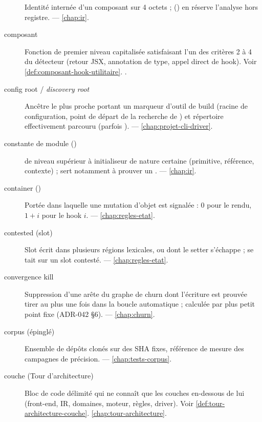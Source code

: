 \begin{description}
\item[] Identité internée d'un composant sur 4 octets ;  () en réserve l'analyse hors registre.  — \cref{chap:ir}.

\item[composant] Fonction de premier niveau capitalisée satisfaisant l'un des critères 2 à 4 du détecteur (retour JSX, annotation de type, appel direct de hook). Voir \cref{def:composant-hook-utilitaire}. .

\item[config root / \emph{discovery root}] Ancêtre le plus proche portant un marqueur d'outil de build (racine de configuration, point de départ de la recherche de ) et répertoire effectivement parcouru (parfois ).  — \cref{chap:projet-cli-driver}.

\item[constante de module ()]  de niveau supérieur à initialiseur de nature certaine (primitive, référence, contexte) ; sert notamment à prouver un .  — \cref{chap:ir}.

\item[container ()] Portée dans laquelle une mutation d'objet est signalée : 0 pour le rendu, \(1{+}i\) pour le hook \(i\).  — \cref{chap:regles-etat}.

\item[contested (slot)] Slot écrit dans plusieurs régions lexicales, ou dont le setter s'échappe ;  se tait sur un slot contesté.  — \cref{chap:regles-etat}.

\item[convergence kill] Suppression d'une arête du graphe de churn dont l'écriture est prouvée tirer au plus une fois dans la boucle automatique ; calculée par plus petit point fixe (ADR-042 §6).  — \cref{chap:churn}.

\item[corpus (épinglé)] Ensemble de dépôts  clonés sur des SHA fixes, référence de mesure des campagnes de précision.  — \cref{chap:tests-corpus}.

\item[couche (Tour d'architecture)] Bloc de code délimité qui ne connaît que les couches en-dessous de lui (front-end, IR, domaines, moteur, règles, driver). Voir \cref{def:tour-architecture-couche}. \cref{chap:tour-architecture}.


\end{description}

